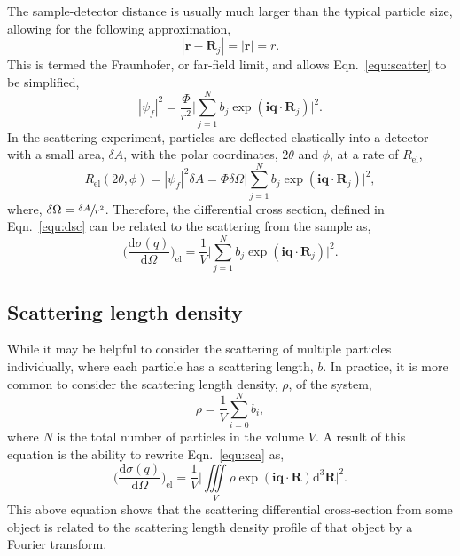 The sample-detector distance is usually much larger than the typical particle size, allowing for the following approximation,
%
\begin{equation}
	|\mathbf{r} - \mathbf{R}_j| = |\mathbf{r}| = r.
\end{equation}
%
This is termed the Fraunhofer, or far-field limit, and allows Eqn.~\ref{equ:scatter} to be simplified,
%
\begin{equation}
	|\psi_f|^2 = \frac{\Phi}{r^2}\Bigg|\sum_{j=1}^{N}b_j\exp{(\mathbf{iq}\cdot\mathbf{R}_j)}\Bigg|^2.
\end{equation}
%
In the scattering experiment, particles are deflected elastically into a detector with a small area, $\delta A$, with the polar coordinates, $2\theta$ and $\phi$, at a rate of $R_{\text{el}}$,
%
\begin{equation}
	R_{\text{el}}(2\theta,\phi) = |\psi_f|^2\delta A = \Phi\delta\Omega\Bigg|\sum_{j=1}^{N}b_j\exp{(\mathbf{iq}\cdot\mathbf{R}_j)}\Bigg|^2,
\end{equation}
%
where, $\delta\Omega = \sfrac{\delta A}{r^2}$.
Therefore, the differential cross section, defined in Eqn.~\ref{equ:dsc} can be related to the scattering from the sample as,
%
\begin{equation}
	\bigg(\frac{\text{d}\sigma(q)}{\text{d}\Omega}\bigg)_{\text{el}} = \frac{1}{V} \Bigg|\sum_{j=1}^{N}b_j\exp{(\mathbf{iq}\cdot\mathbf{R}_j)}\Bigg|^2.
	\label{equ:sca}
\end{equation}
%

\subsection{Scattering length density}
\label{sec:sld}

While it may be helpful to consider the scattering of multiple particles individually, where each particle has a scattering length, $b$.
In practice, it is more common to consider the scattering length density, $\rho$, of the system,
%
\begin{equation}
	\rho = \frac{1}{V}\sum_{i=0}^{N} b_i,
\end{equation}
%
where $N$ is the total number of particles in the volume $V$.
A result of this equation is the ability to rewrite Eqn.~\ref{equ:sca} as,
%
\begin{equation}
	\bigg(\frac{\text{d}\sigma(q)}{\text{d}\Omega}\bigg)_{\text{el}} = \frac{1}{V} \Bigg|\iiint \limits_V \rho\exp{(\mathbf{iq}\cdot\mathbf{R})}\text{d}^3\mathbf{R}\Bigg|^2.
	\label{equ:sldsca}
\end{equation}
%
This above equation shows that the scattering differential cross-section from some object is related to the scattering length density profile of that object by a Fourier transform.

